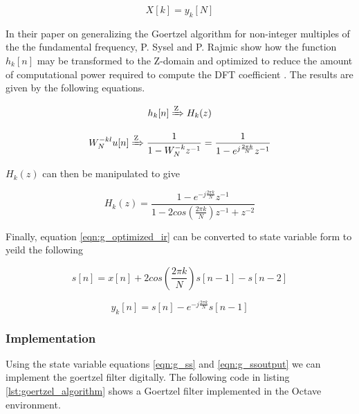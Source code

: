 \begin{equation}
\label{eqn:goertzel_relationship}
X[k] = y_k[N]
\end{equation}


In their paper on generalizing the Goertzel algorithm for non-integer multiples of the the fundamental frequency, P. Sysel and P. Rajmic show how the function $h_k[n]$ may be transformed to the Z-domain and optimized to reduce the amount of computational power required to compute the DFT coefficient \cite{Sysel2012}. The results are given by the following equations.

\[h_k[n] \xRightarrow{\text{Z}} H_k(z)\]

\begin{equation}
W_N^{-kl}u[n] \xRightarrow{\text{Z}} \frac{1}{1 - W_N^{-k}z^{-1}} = \frac{1}{1 - e^{j\frac{2\pi k}{N}}z^{-1}}
\end{equation}

$H_k(z)$ can then be manipulated to give

\begin{equation}
\label{eqn:g_optimized_ir}
H_k(z) = \frac{1 - e^{-j\frac{2\pi k}{N}}z^{-1}}{1 - 2cos(\frac{2\pi k}{N})z^{-1} + z^{-2}}
\end{equation}

Finally, equation \ref{eqn:g_optimized_ir} can be converted to state variable form to yeild the following


\begin{equation}
	\label{eqn:g_ss}
	s[n] = x[n]+2cos(\frac{2\pi k}{N})s[n-1]-s[n-2]
\end{equation}


\begin{equation}
	\label{eqn:g_ssoutput}
	y_k[n] = s[n]-e^{-j\frac{2\pi k}{N}}s[n-1]
\end{equation}



\subsubsection{Implementation}
\label{sec:goertzel_implementation}
Using the state variable equations \ref{eqn:g_ss} and \ref{eqn:g_ssoutput} we can implement the goertzel filter digitally. The following code in listing \ref{lst:goertzel_algorithm} shows a Goertzel filter implemented in the Octave environment.

